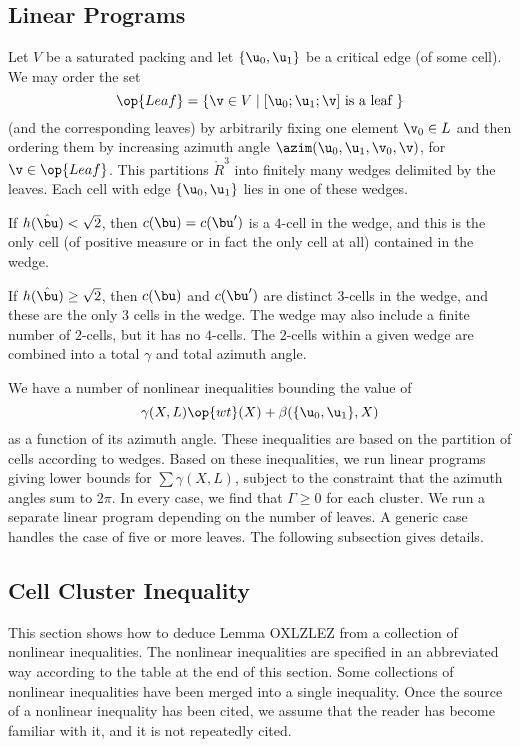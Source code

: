 \subsection{Linear Programs}

Let $V$ be a saturated packing and let $\{\u_0,\u_1\}$ be a critical edge (of some cell).
We may order the set 
\[
\op{Leaf} = \{ \v\in V \mid [\u_0;\u_1;\v] \text{ is a leaf } \}
\]
(and the corresponding leaves)
by arbitrarily fixing one element $\v_0\in L$ and then ordering them by increasing
azimuth angle $\azim(\u_0,\u_1,\v_0,\v)$, for $\v\in \op{Leaf}$.  This partitions $\ring{R}^3$ into
finitely many wedges delimited by the leaves.  Each cell with edge $\{\u_0,\u_1\}$ lies in one of these
wedges.    

If $h(\hat\bu) < \sqrt2$, then $c(\bu)=c(\bu')$ is a $4$-cell in the wedge,
 and this is the only cell  (of positive measure or in fact the only cell at all)
contained in the wedge.

If $h(\hat\bu)\ge\sqrt2$, then $c(\bu)$ and $c(\bu')$ are distinct $3$-cells in the wedge,
and these are the only $3$ cells in the wedge.  The wedge may also include a finite number of 
$2$-cells, but it has no $4$-cells.  The $2$-cells within a given wedge are combined into a 
total $\gamma$ and total azimuth angle.

We have a number of nonlinear inequalities bounding the value of 
\[
\gamma(X,L) \op{wt}(X) + \beta(\{\u_0,\u_1\},X)
\]
 as a function
of its azimuth angle.  These inequalities are based on the partition of cells according to wedges.
Based on these inequalities,
we run linear programs giving lower bounds for $\sum \gamma(X,L)$, subject to the constraint
that the azimuth angles sum to $2\pi$.  In every case, we find that $\Gamma\ge0$ for each cluster.
We run a separate linear program depending on the number of leaves.  A generic case handles
the case of five or more leaves.
The following subsection gives details.


\subsection{Cell Cluster Inequality}

This section shows how to deduce Lemma OXLZLEZ from a collection of nonlinear inequalities.
The nonlinear inequalities are specified in an abbreviated way according to the table at the end of this section.
Some collections of  nonlinear inequalities have been merged into a single inequality.
Once the source of a nonlinear inequality has been cited, we assume that the reader has become
familiar with it, and it is not repeatedly cited.

